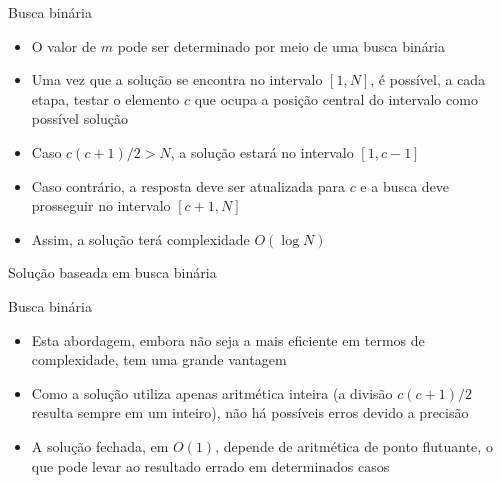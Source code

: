 \begin{frame}[fragile]{Busca binária}

    \begin{itemize}
        \item O valor de $m$ pode ser determinado por meio de uma busca binária

        \item Uma vez que a solução se encontra no intervalo $[1, N]$, é possível, a cada etapa, testar o elemento $c$ que ocupa a posição central do intervalo como possível solução

        \item Caso $c(c + 1)/2 > N$, a solução estará no intervalo $[1, c - 1]$

        \item Caso contrário, a resposta deve ser atualizada para $c$ e a busca deve prosseguir no intervalo $[c + 1, N]$ 

        \item Assim, a solução terá complexidade $O(\log N)$
    \end{itemize}

\end{frame}

\begin{frame}[fragile]{Solução baseada em busca binária}


\end{frame}

\begin{frame}[fragile]{Busca binária}

    \begin{itemize}
        \item Esta abordagem, embora não seja a mais eficiente em termos de complexidade, tem uma grande vantagem

        \item Como a solução utiliza apenas aritmética inteira (a divisão $c(c + 1)/2$ resulta sempre em um inteiro), não há possíveis erros devido a precisão

        \item A solução fechada, em $O(1)$, depende de aritmética de ponto flutuante, o que pode levar ao resultado errado em determinados casos


    \end{itemize}

\end{frame}

